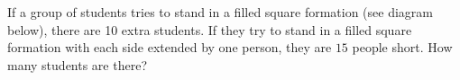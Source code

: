 If a group of students tries to stand in a filled square formation (see diagram below), there are 10 extra students. If they try to stand in a filled square formation with each side extended by one person, they are $15$ people short. How many students are there?
